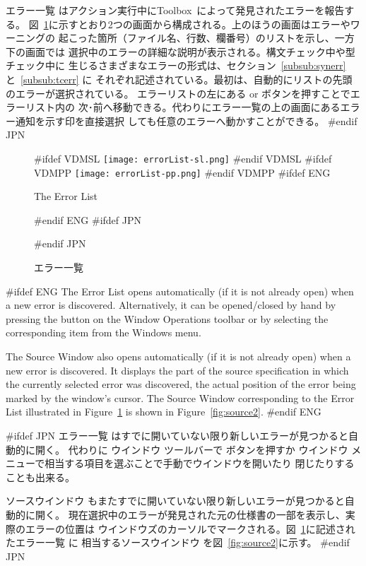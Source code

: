 \documentclass[\pformat,12pt]{article}
\newcommand{\Toolbox}{Toolbox}
\newcommand{\Toolbox}{Toolbox}
\newcommand{\guicmd}[1]{{\sf #1}}
\newcommand{\guicmd}[1]{{\gt #1}}
\begin{document}
\guicmd{エラー一覧} はアクション実行中に\Toolbox\ によって発見されたエラーを報告する。
図~\ref{fig:error2}に示すとおり2つの画面から構成される。上のほうの画面はエラーやワーニングの
起こった箇所（ファイル名、行数、欄番号）のリストを示し、一方下の画面では
選択中のエラーの詳細な説明が表示される。構文チェック中や型チェック中に
生じるさまざまなエラーの形式は、セクション~\ref{subsub:synerr} と~\ref{subsub:tcerr} に
それぞれ記述されている。最初は、自動的にリストの先頭のエラーが選択されている。
エラーリストの左にある {\fbox{\tt >}} or \fbox{{\tt <}} ボタンを押すことでエラーリスト内の
次･前へ移動できる。代わりに\guicmd{エラー一覧}の上の画面にあるエラー通知を示す印を直接選択
しても任意のエラーへ動かすことができる。
#endif JPN

\begin{figure}[tbh]
\begin{center}
#ifdef VDMSL
\texttt{[image: errorList-sl.png]}
#endif VDMSL
#ifdef VDMPP
\texttt{[image: errorList-pp.png]}
#endif VDMPP
#ifdef ENG
\caption{The Error List}
#endif ENG
#ifdef JPN
\caption{エラー一覧}
#endif JPN
\label{fig:error2}
\end{center}
\end{figure}

#ifdef ENG
The \guicmd{Error List} opens automatically (if it is not already
open) when a new error is discovered. Alternatively, it can be
opened/closed by hand by pressing the  
button on the \guicmd{Window Operations} toolbar or by
selecting the corresponding item from the \guicmd{Windows} menu.

The \guicmd{Source Window} also opens automatically (if it is not
already open) when a new error is discovered. It displays the part of 
the source specification in which the currently selected error was
discovered, the actual position of the error being marked by the
window's cursor. The \guicmd{Source Window} corresponding to the
\guicmd{Error List} illustrated in Figure~\ref{fig:error2} is shown in  
Figure~\ref{fig:source2}.
#endif ENG

#ifdef JPN
\guicmd{エラー一覧} はすでに開いていない限り新しいエラーが見つかると自動的に開く。
代わりに \guicmd{ウインドウ} ツールバーで 
ボタンを押すか
\guicmd{ウインドウ} メニューで相当する項目を選ぶことで手動でウインドウを開いたり
閉じたりすることも出来る。

\guicmd{ソースウインドウ} もまたすでに開いていない限り新しいエラーが見つかると自動的に開く。
現在選択中のエラーが発見された元の仕様書の一部を表示し、実際のエラーの位置は
ウインドウズのカーソルでマークされる。図~\ref{fig:error2}に記述された\guicmd{エラー一覧} に
相当する\guicmd{ソースウインドウ} を図~\ref{fig:source2}に示す。
#endif JPN
\end{document}
